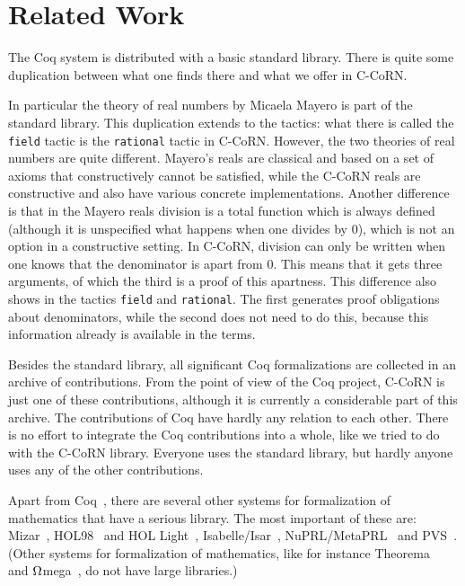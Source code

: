 \documentclass[runningheads]{llncs}
\newcommand{\ccorn}{\mbox{C-CoRN}}
\begin{document}
\section{Related Work\label{related}} 

The Coq system is distributed with a basic standard library.
There is quite some duplication between what one finds there
and what we offer in {\ccorn}.

In particular the theory of real numbers by Micaela Mayero
\cite{mayero2001} is part of the standard library.
This duplication extends to the tactics: what there is called the
\texttt{field} tactic is the \texttt{rational} tactic in {\ccorn}.
However, the two theories of real numbers are quite different.
Mayero's reals are classical and based on a set of axioms that
constructively cannot be satisfied, while the {\ccorn} reals are
constructive and also have various concrete implementations.  Another
difference is that in the Mayero reals division is a total function
which is always defined (although it is unspecified what happens when
one divides by $0$), which is not an option in a constructive
setting.  In {\ccorn}, division can only be written when one knows
that the denominator is apart from $0$.  This means that it gets three
arguments, of which the third is a proof of this apartness.  This
difference also shows in the tactics \texttt{field} and
\texttt{rational}.  The first generates proof obligations about
denominators, while the second does not need to do this, because this
information already is available in the terms.

Besides the standard library, all significant Coq formalizations
are collected in an archive of contributions.
{From} the point of view of the Coq project, {\ccorn} is just
one of these contributions,
although it is currently 
a considerable part of this archive.
The contributions of Coq have hardly any relation to each other.
There is no effort to integrate the Coq contributions into
a whole, like we tried to do with the {\ccorn} library.
Everyone uses the standard library, but hardly anyone uses any of
the other contributions.

Apart from Coq~\cite{coqmanual},
there are several other systems for formalization of mathematics
that have a serious library.
The most important of these are:
Mizar~\cite{mizar}, HOL98~\cite{hol} and HOL Light~\cite{hol-light},
Isabelle/Isar~\cite{Isar}, NuPRL/Meta\-PRL~\cite{nuprl} and PVS~\cite{pvs}.
(Other systems for formalization of mathematics, like for instance
Theorema~\cite{theorema} and $\rm\Omega$mega~\cite{omega},
do not have large libraries.)
\end{document}
